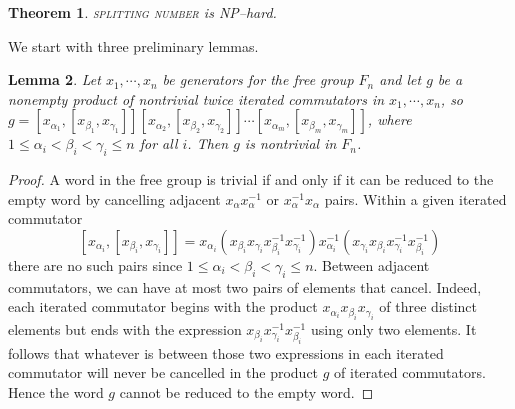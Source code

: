 \documentclass[12pt]{amsart}
\newtheorem{thm}{Theorem}
\newtheorem{lemma}[thm]{Lemma}
\theoremstyle{definition}
\theoremstyle{remark}
\begin{document}
\begin{thm}
\textsc{splitting number} is NP--hard.
\label{thm_splitting}
\end{thm}

 We start with three preliminary lemmas.

\begin{lemma}
Let $x_1, \cdots , x_n$ be generators for the free group $F_n$ and let $g$ be a nonempty product of nontrivial twice iterated commutators in $x_1, \cdots, x_n$, so $g = [x_{\alpha_1}, [ x_{\beta_1}, x_{\gamma_1}]][x_{\alpha_2}, [ x_{\beta_2}, x_{\gamma_2}]] \cdots  [x_{\alpha_m}, [ x_{\beta_m}, x_{\gamma_m}]]$, where $1 \le \alpha_i < \beta_i < \gamma_i \le n$ for all $i$.  Then $g$ is nontrivial in $F_n$.
\label{lem_freeword}
\end{lemma}

\begin{proof}
A word in the free group is trivial if and only if it can be reduced to the empty word by cancelling adjacent $x_\alpha x_\alpha^{-1}$ or $x_\alpha^{-1}x_\alpha$ pairs.  Within a given iterated commutator $$[x_{\alpha_i}, [ x_{\beta_i}, x_{\gamma_i}]]  = x_{\alpha_i}(x_{\beta_i}x_{\gamma_i}x_{\beta_i}^{-1}x_{\gamma_i}^{-1})x_{\alpha_i}^{-1}(x_{\gamma_i}x_{\beta_i}x_{\gamma_i}^{-1}x_{\beta_i}^{-1})$$ there are no such pairs since $1 \le \alpha_i < \beta_i < \gamma_i \le n$.  Between adjacent commutators, we can have at most two pairs of elements that cancel.  Indeed, each iterated commutator begins with the product $x_{\alpha_i}x_{\beta_i}x_{\gamma_i}$ of three distinct elements but ends with the expression $x_{\beta_i}x_{\gamma_i}^{-1}x_{\beta_i}^{-1}$ using only two elements.  It follows that whatever is between those two expressions in each iterated commutator will never be cancelled in the product $g$ of iterated commutators. Hence the word $g$ cannot be reduced to the empty word.
\end{proof}
\end{document}
